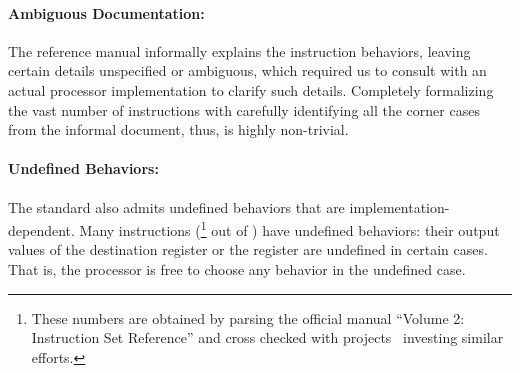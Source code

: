 \paragraph{Ambiguous Documentation:}
%
The \ISA reference manual informally explains the instruction behaviors, leaving certain details unspecified or ambiguous, which required us to consult with an actual processor implementation to clarify such details.
%
Completely formalizing the vast number of instructions with carefully identifying all the corner cases from the informal document, thus, is highly non-trivial.






\paragraph{Undefined Behaviors:}
%
The \ISA standard also admits undefined behaviors that are implementation-dependent.
Many instructions (\undefIntel{}\footnote{\label{note1}These numbers are obtained by parsing the official manual ``Volume 2: Instruction Set Reference'' and cross checked with projects~\cite{Stoke2013, Felix} investing similar efforts.} out of \totalIntel{}) have undefined behaviors: their output values of the destination register or the  register are undefined in certain cases.
That is, the processor is free to choose any behavior in the undefined case.
%

